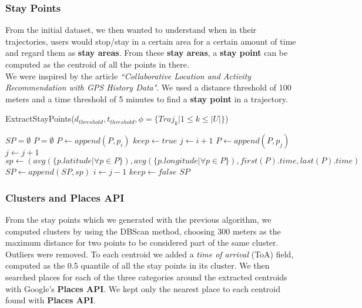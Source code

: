 \documentclass[../../main]{subfiles}
\begin{document}
\subsubsection{Stay Points}
\label{sss:stay-points}
From the initial dataset, we then wanted to understand when in their trajectories, users would stop/stay in a certain area for a certain amount of time and regard them as \textbf{stay areas}.
From these \textbf{stay areas}, a \textbf{stay point} can be computed as the centroid of all the points in there.\\
We were inspired by the article \textit{``Collaborative Location and Activity Recommendation with GPS History Data"}. 
We used a distance threshold of 100 meters and a time threshold of 5 minutes to find a \textbf{stay point} in a trajectory.
\begin{algorithm}
    \caption{ExtractStayPoints($d_{threshold}, t_{threshold}, \phi{}=\{Traj_k | 1 \le{} k \le{} |U|\}$)}
    \begin{algorithmic}
        \STATE $SP = \emptyset$
                \STATE $P = \emptyset$
                \STATE $P \leftarrow{} append(P, p_i)$
                \STATE $keep \leftarrow{} true$
                \STATE $j \leftarrow{} i + 1$
                        \STATE $P \leftarrow{} append(P, p_j)$
                        \STATE $j \leftarrow{} j + 1$
                    \ELSE
                            \STATE $sp \leftarrow{} (avg(\{p.latitude | \forall{} p \in{} P\}), avg(\{p.longitude | \forall{} p \in{} P\}), first(P).time, last(P).time)$
                            \STATE $SP \leftarrow{} append(SP, sp)$
                            \STATE $i \leftarrow{} j - 1$
                        \ENDIF
                        \STATE $keep \leftarrow{} false$
                    \ENDIF
                \ENDWHILE
            \ENDFOR
        \ENDFOR
        \RETURN $SP$
    \end{algorithmic}
\end{algorithm}

\subsubsection{Clusters and Places API}
\label{sss:cluster}
From the stay points which we generated with the previous algorithm, we computed clusters by using the DBScan method, choosing 300 meters as the maximum distance for two points to be considered part of the same cluster.
Outliers were removed.
To each centroid we added a \textit{time of arrival} (ToA) field, computed as the 0.5 quantile of all the stay points in its cluster.
We then searched places for each of the three categories around the extracted centroids with Google's \textbf{Places API}.
We kept only the nearest place to each centroid found with \textbf{Places API}.
\end{document}
